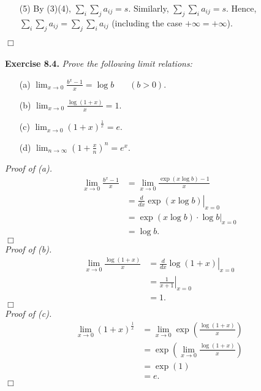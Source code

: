 \documentclass{article}
\begin{document}
\begin{enumerate}
  \item[(5)]
  By (3)(4), $\sum_{i}\sum_{j} a_{ij} = s$.
  Similarly, $\sum_{j}\sum_{i} a_{ij} = s$.
  Hence, $\sum_{i}\sum_{j} a_{ij} = \sum_{j}\sum_{i} a_{ij}$
  (including the case $+\infty = +\infty$).
\end{enumerate}
$\Box$ \\\\






\textbf{Exercise 8.4.}
\emph{Prove the following limit relations:}
\begin{enumerate}
  \item[(a)]
  $\lim_{x \to 0} \frac{b^x - 1}{x} = \log b \:\:\:\:\:\:\:\: (b > 0).$
  \item[(b)]
  $\lim_{x \to 0} \frac{\log(1+x)}{x} = 1.$
  \item[(c)]
  $\lim_{x \to 0} (1+x)^{\frac{1}{x}} = e.$
  \item[(d)]
  $\lim_{n \to \infty} \left( 1 + \frac{x}{n} \right)^{n} = e^x.$ \\
\end{enumerate}

\emph{Proof of (a).}
\begin{align*}
  \lim_{x \to 0} \frac{b^x - 1}{x}
  &= \lim_{x \to 0} \frac{\exp(x \log b) - 1}{x} \\
  &= \left. \frac{d}{dx} \exp(x \log b) \right\vert_{x=0} \\
  &= \left. \exp(x \log b) \cdot \log b \right\vert_{x=0} \\
  &= \log b.
\end{align*}
$\Box$ \\

\emph{Proof of (b).}
\begin{align*}
  \lim_{x \to 0} \frac{\log(1+x)}{x}
  &= \left. \frac{d}{dx} \log(1+x) \right\vert_{x=0} \\
  &= \left. \frac{1}{x+1} \right\vert_{x=0} \\
  &= 1.
\end{align*}
$\Box$ \\

\emph{Proof of (c).}
\begin{align*}
  \lim_{x \to 0} (1+x)^{\frac{1}{x}}
  &= \lim_{x \to 0} \exp\left( \frac{\log(1+x)}{x} \right) \\
  &= \exp\left( \lim_{x \to 0} \frac{\log(1+x)}{x} \right) \\
  &= \exp(1) \\
  &= e.
\end{align*}
$\Box$ \\
\end{document}
